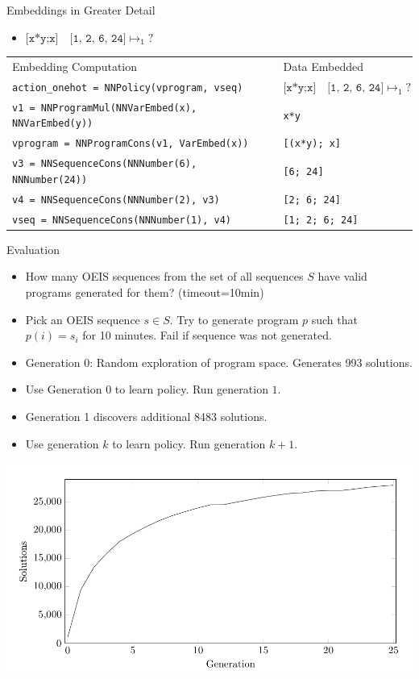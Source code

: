 \documentclass[8pt]{beamer}
\begin{document}
\begin{frame}[fragile]{Embeddings in Greater Detail}
\begin{itemize}
\item $\texttt{[x*y;x]} \quad \texttt{[1, 2, 6, 24]} \mapsto_1 ? $ \pause 
\end{itemize}
\begin{tabular}{ll}
Embedding Computation & Data Embedded  \\
\texttt{action\_onehot = NNPolicy(vprogram, vseq)} & $\texttt{[x*y;x]} \quad \texttt{[1, 2, 6, 24]} \mapsto_1 ? $ \pause  \\
\texttt{v1 = NNProgramMul(NNVarEmbed(x), NNVarEmbed(y))} & \texttt{x*y} \pause \\
\texttt{vprogram = NNProgramCons(v1, VarEmbed(x))} & \texttt{[(x*y); x]} \pause \\
\texttt{v3 = NNSequenceCons(NNNumber(6), NNNumber(24))} & \texttt{[6; 24]} \pause \\
\texttt{v4 = NNSequenceCons(NNNumber(2), v3)}  & \texttt{[2; 6; 24]} \pause \\
\texttt{vseq = NNSequenceCons(NNNumber(1), v4)}  & \texttt{[1; 2; 6; 24]} \pause \\
\end{tabular}
\end{frame}


\begin{frame}{Evaluation}
\begin{itemize}
\item How many OEIS sequences from the set of all sequences $S$ have valid programs generated for them? (timeout=10min) \pause
\item Pick an OEIS sequence $s \in S$. Try to generate program $p$ such that $p(i) = s_i$ for 10 minutes. Fail if sequence was not generated. \pause
\item Generation $0$: Random exploration of program space. Generates 993 solutions. \pause
\item Use Generation $0$ to learn policy. Run generation $1$. \pause
\item Generation 1 discovers additional 8483 solutions. \pause
\item Use generation $k$ to learn policy. Run generation $k+1$. \pause
\end{itemize}
\includegraphics[width=\textwidth]{./plot-1.png} \pause
\end{frame}
\end{document}
